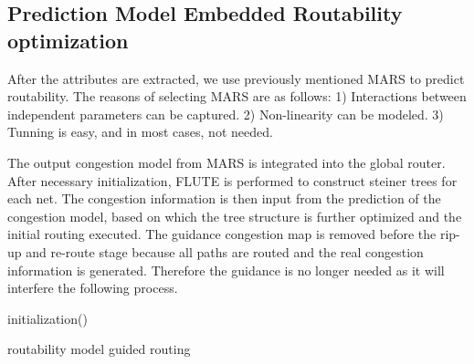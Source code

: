 \subsection{Prediction Model Embedded Routability optimization}
After the attributes are extracted, we use previously mentioned MARS \cite{MARS} to predict routability. The reasons of selecting MARS are as follows: 1) Interactions between independent parameters can be captured. 2) Non-linearity can be modeled. 3) Tunning is easy, and in most cases, not needed. 

The output congestion model from MARS is integrated into the global router. After necessary initialization, FLUTE is performed to construct steiner trees for each net. The congestion information is then input from the prediction of the congestion model, based on which the tree structure is further optimized and the initial routing executed. The guidance congestion map is removed before the rip-up and re-route stage because all paths are routed and the real congestion information is generated. Therefore the guidance is no longer needed as it will interfere the following process.

\begin{algorithm}
\SetAlgoLined
{}
 initialization()\;
 \caption{routability model guided routing}
\end{algorithm}